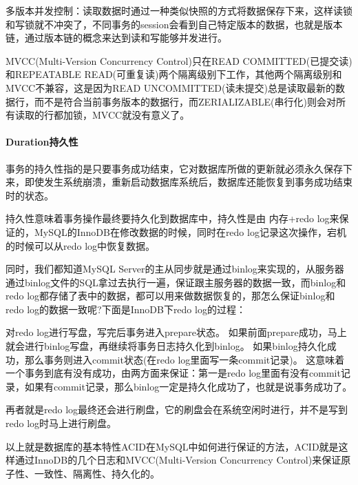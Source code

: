 \documentclass[../../../interview-questions.tex]{subfiles}
\begin{document}
多版本并发控制：读取数据时通过一种类似快照的方式将数据保存下来，这样读锁和写锁就不冲突了，不同事务的session会看到自己特定版本的数据，也就是版本链，通过版本链的概念来达到读和写能够并发进行。

MVCC(Multi-Version Concurrency Control)只在READ COMMITTED(已提交读)和REPEATABLE READ(可重复读)两个隔离级别下工作，其他两个隔离级别和MVCC不兼容，这是因为READ UNCOMMITTED(读未提交)总是读取最新的数据行，而不是符合当前事务版本的数据行，而ZERIALIZABLE(串行化)则会对所有读取的行都加锁，MVCC就没有意义了。

\paragraph{Duration持久性}

事务的持久性指的是只要事务成功结束，它对数据库所做的更新就必须永久保存下来，即使发生系统崩溃，重新启动数据库系统后，数据库还能恢复到事务成功结束时的状态。

持久性意味着事务操作最终要持久化到数据库中，持久性是由 内存+redo log来保证的，MySQL的InnoDB在修改数据的时候，同时在redo log记录这次操作，宕机的时候可以从redo log中恢复数据。

同时，我们都知道MySQL Server的主从同步就是通过binlog来实现的，从服务器通过binlog文件的SQL拿过去执行一遍，保证跟主服务器的数据一致，而binlog和redo log都存储了表中的数据，都可以用来做数据恢复的，那怎么保证binlog和redo log的数据一致呢?下面是InnoDB下redo log的过程：

对redo log进行写盘，写完后事务进入prepare状态。
如果前面prepare成功，马上就会进行binlog写盘，再继续将事务日志持久化到binlog。
如果binlog持久化成功，那么事务则进入commit状态(在redo log里面写一条commit记录)。
这意味着一个事务到底有没有成功，由两方面来保证：第一是redo log里面有没有commit记录，如果有commit记录，那么binlog一定是持久化成功了，也就是说事务成功了。

再者就是redo log最终还会进行刷盘，它的刷盘会在系统空闲时进行，并不是写到redo log时马上进行刷盘。

以上就是数据库的基本特性ACID在MySQL中如何进行保证的方法，ACID就是这样通过InnoDB的几个日志和MVCC(Multi-Version Concurrency Control)来保证原子性、一致性、隔离性、持久化的。
\end{document}
